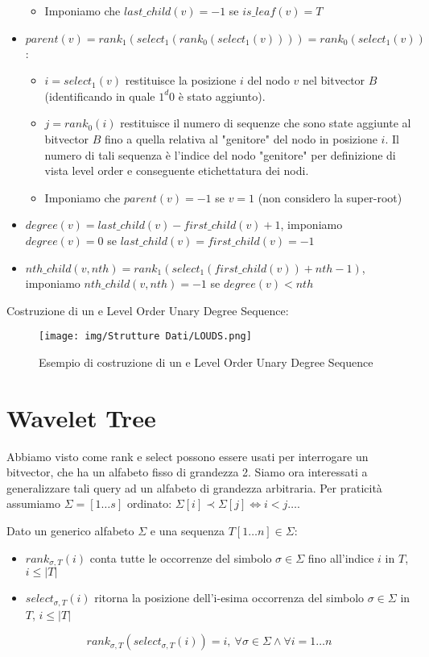 \begin{itemize}
\begin{itemize}
        \item Imponiamo che $last\_child(v) = -1$ se $is\_leaf (v) = T$
    \end{itemize}
    \item $parent(v) = rank_1(select_1(rank_0(select_1(v)))) = rank_0(select_1(v))$:
    \begin{itemize}
        \item $i = select_1(v)$ restituisce la posizione $i$ del nodo $v$ nel bitvector $B$ (identificando in quale $1^d 0$ è stato aggiunto).
        \item $j = rank_0(i)$ restituisce il numero di sequenze che sono state aggiunte al bitvector $B$ fino a quella relativa al "genitore" del nodo in posizione $i$. Il numero di tali sequenza è l'indice del nodo "genitore" per definizione di vista level order e conseguente etichettatura dei nodi.
        \item Imponiamo che $parent(v) = -1$ se $v = 1$ (non considero la super-root)
    \end{itemize}
    \item $degree(v) = last\_child(v) - first\_child(v) + 1$, imponiamo $degree(v) = 0$ se $last\_child(v) = first\_child(v) = -1$
    \item $nth\_child(v, nth) = rank_1(select_1(first\_child(v)) + nth - 1)$, imponiamo $nth\_child(v, nth) = -1$ se $degree(v) < nth$
\end{itemize}
\begin{esempio}
    Costruzione di un e Level Order Unary Degree Sequence:
    \begin{figure}[!ht]
        \centering
        \texttt{[image: img/Strutture Dati/LOUDS.png]}
        \caption{Esempio di costruzione di un e Level Order Unary Degree Sequence}
    \end{figure}
\end{esempio}
\section{Wavelet Tree}
Abbiamo visto come rank e select possono essere usati per interrogare un bitvector, che ha un alfabeto fisso di grandezza 2. Siamo ora interessati a generalizzare tali query ad un alfabeto di grandezza arbitraria. Per praticità assumiamo $\Sigma = [1 \dots s]$ ordinato: $\Sigma[i] \prec \Sigma[j] \iff i < j \dots$.

Dato un generico alfabeto $\Sigma$ e una sequenza $T[1\dots n] \in \Sigma$:
\begin{itemize}
    \item $rank_{\sigma,T} (i)$ conta tutte le occorrenze del simbolo $\sigma \in \Sigma$ fino all'indice $i$ in $T$, $i \leq | T |$
    \item $select_{\sigma,T} (i)$ ritorna la posizione dell'i-esima occorrenza del simbolo $\sigma \in \Sigma$ in $T$, $i \leq | T |$
\end{itemize}
\begin{equation}
    rank_{\sigma,T} (select_{\sigma,T} (i)) = i, \ \forall \sigma \in \Sigma \land \forall i = 1 \dots n
\end{equation}


